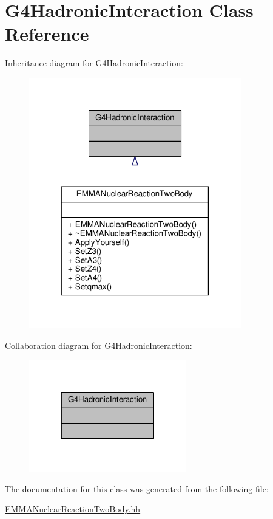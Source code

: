 \hypertarget{classG4HadronicInteraction}{}\section{G4\+Hadronic\+Interaction Class Reference}
\label{classG4HadronicInteraction}


Inheritance diagram for G4\+Hadronic\+Interaction\+:
\nopagebreak
\begin{figure}[H]
\begin{center}
\leavevmode
\includegraphics[width=262pt]{classG4HadronicInteraction__inherit__graph}
\end{center}
\end{figure}


Collaboration diagram for G4\+Hadronic\+Interaction\+:
\nopagebreak
\begin{figure}[H]
\begin{center}
\leavevmode
\includegraphics[width=194pt]{classG4HadronicInteraction__coll__graph}
\end{center}
\end{figure}


The documentation for this class was generated from the following file\+:\begin{DoxyCompactItemize}
\item 
\hyperlink{EMMANuclearReactionTwoBody_8hh}{E\+M\+M\+A\+Nuclear\+Reaction\+Two\+Body.\+hh}\end{DoxyCompactItemize}
